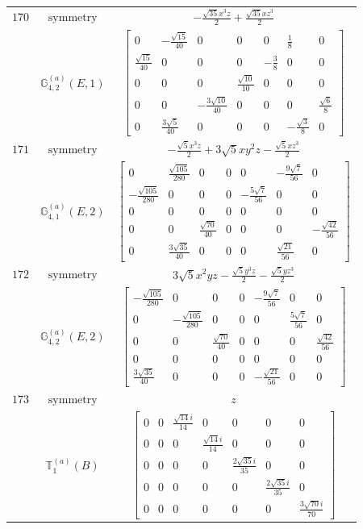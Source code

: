 \documentclass[fleqn,8pt,landscape]{jsarticle}
\begin{document}
\begin{longtable}{ccc}
$ 170 $ & $ \text{symmetry} $ & $ - \frac{\sqrt{35} x^{3} z}{2} + \frac{\sqrt{35} x z^{3}}{2} $ \\
$  $ & $ \mathbb{G}_{4,2}^{(a)}(E,1) $ & $ \begin{bmatrix} 0 & - \frac{\sqrt{15}}{40} & 0 & 0 & 0 & \frac{1}{8} & 0 \\ \frac{\sqrt{15}}{40} & 0 & 0 & 0 & - \frac{3}{8} & 0 & 0 \\ 0 & 0 & 0 & \frac{\sqrt{10}}{10} & 0 & 0 & 0 \\ 0 & 0 & - \frac{3 \sqrt{10}}{40} & 0 & 0 & 0 & \frac{\sqrt{6}}{8} \\ 0 & \frac{3 \sqrt{5}}{40} & 0 & 0 & 0 & - \frac{\sqrt{3}}{8} & 0 \end{bmatrix} $ \\ \hline
$ 171 $ & $ \text{symmetry} $ & $ - \frac{\sqrt{5} x^{3} z}{2} + 3 \sqrt{5} x y^{2} z - \frac{\sqrt{5} x z^{3}}{2} $ \\
$  $ & $ \mathbb{G}_{4,1}^{(a)}(E,2) $ & $ \begin{bmatrix} 0 & \frac{\sqrt{105}}{280} & 0 & 0 & 0 & - \frac{9 \sqrt{7}}{56} & 0 \\ - \frac{\sqrt{105}}{280} & 0 & 0 & 0 & - \frac{5 \sqrt{7}}{56} & 0 & 0 \\ 0 & 0 & 0 & 0 & 0 & 0 & 0 \\ 0 & 0 & \frac{\sqrt{70}}{40} & 0 & 0 & 0 & - \frac{\sqrt{42}}{56} \\ 0 & \frac{3 \sqrt{35}}{40} & 0 & 0 & 0 & \frac{\sqrt{21}}{56} & 0 \end{bmatrix} $ \\ \hline
$ 172 $ & $ \text{symmetry} $ & $ 3 \sqrt{5} x^{2} y z - \frac{\sqrt{5} y^{3} z}{2} - \frac{\sqrt{5} y z^{3}}{2} $ \\
$  $ & $ \mathbb{G}_{4,2}^{(a)}(E,2) $ & $ \begin{bmatrix} - \frac{\sqrt{105}}{280} & 0 & 0 & 0 & - \frac{9 \sqrt{7}}{56} & 0 & 0 \\ 0 & - \frac{\sqrt{105}}{280} & 0 & 0 & 0 & \frac{5 \sqrt{7}}{56} & 0 \\ 0 & 0 & \frac{\sqrt{70}}{40} & 0 & 0 & 0 & \frac{\sqrt{42}}{56} \\ 0 & 0 & 0 & 0 & 0 & 0 & 0 \\ \frac{3 \sqrt{35}}{40} & 0 & 0 & 0 & - \frac{\sqrt{21}}{56} & 0 & 0 \end{bmatrix} $ \\ \hline
$ 173 $ & $ \text{symmetry} $ & $ z $ \\
$  $ & $ \mathbb{T}_{1}^{(a)}(B) $ & $ \begin{bmatrix} 0 & 0 & \frac{\sqrt{14} i}{14} & 0 & 0 & 0 & 0 \\ 0 & 0 & 0 & \frac{\sqrt{14} i}{14} & 0 & 0 & 0 \\ 0 & 0 & 0 & 0 & \frac{2 \sqrt{35} i}{35} & 0 & 0 \\ 0 & 0 & 0 & 0 & 0 & \frac{2 \sqrt{35} i}{35} & 0 \\ 0 & 0 & 0 & 0 & 0 & 0 & \frac{3 \sqrt{70} i}{70} \end{bmatrix} $ \\ \hline

\end{longtable}
\end{document}
